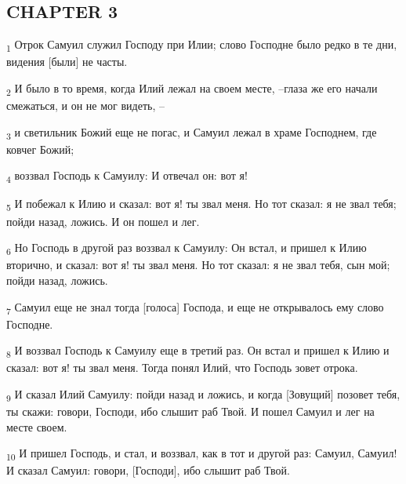 \subsection{CHAPTER 3}
\begin{tcolorbox}
\textsubscript{1} Отрок Самуил служил Господу при Илии; слово Господне было редко в те дни, видения [были] не часты.
\end{tcolorbox}
\begin{tcolorbox}
\textsubscript{2} И было в то время, когда Илий лежал на своем месте, --глаза же его начали смежаться, и он не мог видеть, --
\end{tcolorbox}
\begin{tcolorbox}
\textsubscript{3} и светильник Божий еще не погас, и Самуил лежал в храме Господнем, где ковчег Божий;
\end{tcolorbox}
\begin{tcolorbox}
\textsubscript{4} воззвал Господь к Самуилу: И отвечал он: вот я!
\end{tcolorbox}
\begin{tcolorbox}
\textsubscript{5} И побежал к Илию и сказал: вот я! ты звал меня. Но тот сказал: я не звал тебя; пойди назад, ложись. И он пошел и лег.
\end{tcolorbox}
\begin{tcolorbox}
\textsubscript{6} Но Господь в другой раз воззвал к Самуилу: Он встал, и пришел к Илию вторично, и сказал: вот я! ты звал меня. Но тот сказал: я не звал тебя, сын мой; пойди назад, ложись.
\end{tcolorbox}
\begin{tcolorbox}
\textsubscript{7} Самуил еще не знал тогда [голоса] Господа, и еще не открывалось ему слово Господне.
\end{tcolorbox}
\begin{tcolorbox}
\textsubscript{8} И воззвал Господь к Самуилу еще в третий раз. Он встал и пришел к Илию и сказал: вот я! ты звал меня. Тогда понял Илий, что Господь зовет отрока.
\end{tcolorbox}
\begin{tcolorbox}
\textsubscript{9} И сказал Илий Самуилу: пойди назад и ложись, и когда [Зовущий] позовет тебя, ты скажи: говори, Господи, ибо слышит раб Твой. И пошел Самуил и лег на месте своем.
\end{tcolorbox}
\begin{tcolorbox}
\textsubscript{10} И пришел Господь, и стал, и воззвал, как в тот и другой раз: Самуил, Самуил! И сказал Самуил: говори, [Господи], ибо слышит раб Твой.
\end{tcolorbox}
